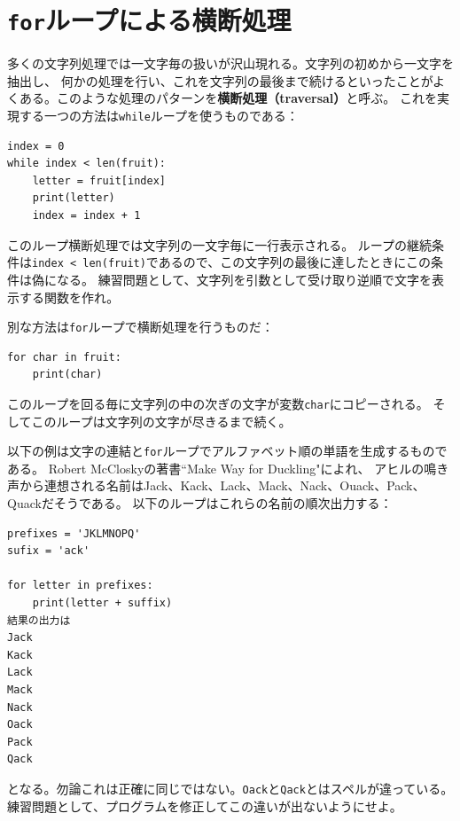 \documentclass[a4j,12pt,makeidx]{jbook}
\begin{document}
\section{{\tt for}ループによる横断処理}
多くの文字列処理では一文字毎の扱いが沢山現れる。文字列の初めから一文字を抽出し、
何かの処理を行い、これを文字列の最後まで続けるといったことがよくある。このような処理のパターンを{\bf 横断処理（traversal）}と呼ぶ。
これを実現する一つの方法は{\tt while}ループを使うものである：
\begin{verbatim}
index = 0
while index < len(fruit):
    letter = fruit[index]
    print(letter)
    index = index + 1
\end{verbatim}    
このループ横断処理では文字列の一文字毎に一行表示される。
ループの継続条件は{\tt index < len(fruit)}であるので、この文字列の最後に達したときにこの条件は偽になる。
練習問題として、文字列を引数として受け取り逆順で文字を表示する関数を作れ。\par
別な方法は{\tt for}ループで横断処理を行うものだ：
\begin{verbatim}
for char in fruit:
    print(char)
\end{verbatim}
このループを回る毎に文字列の中の次ぎの文字が変数{\tt char}にコピーされる。
そしてこのループは文字列の文字が尽きるまで続く。 \par
以下の例は文字の連結と{\tt for}ループでアルファベット順の単語を生成するものである。
Robert McCloskyの著書``Make Way for Duckling"によれ、
アヒルの鳴き声から連想される名前はJack、Kack、Lack、Mack、Nack、Ouack、Pack、Quackだそうである。
以下のループはこれらの名前の順次出力する：
\begin{verbatim}
prefixes = 'JKLMNOPQ'
sufix = 'ack'

for letter in prefixes:
    print(letter + suffix)
結果の出力は
Jack
Kack
Lack
Mack
Nack
Oack
Pack
Qack
\end{verbatim}
となる。勿論これは正確に同じではない。{\tt Oack}と{\tt Qack}とはスペルが違っている。\\
練習問題として、プログラムを修正してこの違いが出ないようにせよ。
%
\end{document}
